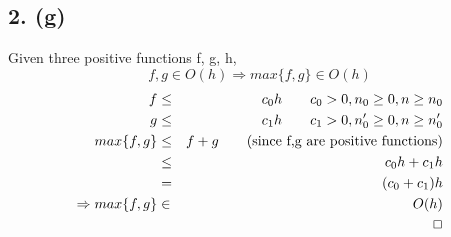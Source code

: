 \documentclass{article}[12pt]
\begin{document}
\newpage

\subsection*{2. (g)}
  Given three positive functions f, g, h,
  \begin{displaymath}
    f,g \in O(h) \Rightarrow max\{f,g\} \in O(h)
  \end{displaymath}
  \begin{eqnarray*}
    f                       & \leq    & c_{0}h \qquad c_{0} > 0, n_{0} \geq 0, n \geq n_{0} \\
    g                       & \leq    & c_{1}h \qquad c_{1} > 0, n_{0}' \geq 0, n \geq n_{0}' \\
    max\{f,g\}              & \leq    & f + g \qquad \textrm{(since f,g are positive functions)} \\
                            & \leq    & c_{0}h + c_{1}h \\
                            & =       & (c_{0} + c_{1})h \\
    \Rightarrow max\{f,g\}  & \in     & O(h) \\
    & & \indent \indent \indent \Box \\
  \end{eqnarray*}
\end{document}
